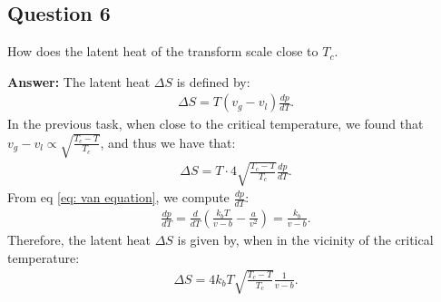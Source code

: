 \documentclass[a4paper]{article}
\newcommand{\newparagraph}{\vspace{.5cm}\noindent}
\begin{document}
\subsection*{Question 6}
How does the latent heat of the transform scale close to $T_c$.

\newparagraph
\textbf{Answer: }The latent heat $\Delta S$ is defined by:
\begin{align*}
    \Delta S = T(v_g - v_l)\frac{dp}{dT}.
\end{align*}In the previous task, when close to the critical temperature, we found that $v_g - v_l \propto \sqrt{\frac{T_c - T}{T_c}}$, and thus we have that:
\begin{align*}
    \Delta S = T \cdot 4 \sqrt{\frac{T_c - T}{T_c}}\frac{dp}{dT}.
\end{align*}From eq \eqref{eq: van equation}, we compute $\frac{dp}{dT}$:
\begin{align*}
    \frac{dp}{dT} = \frac{d}{dT}\left(\frac{k_bT}{v - b} - \frac{a}{v^2}\right) = \frac{k_b}{v - b}.
\end{align*}Therefore, the latent heat $\Delta S$ is given by, when in the vicinity of the critical temperature:
\begin{align*}
    \Delta S = 4k_bT\sqrt{\frac{T_c - T}{T_c}}\frac{1}{v - b}.
\end{align*}
\end{document}
